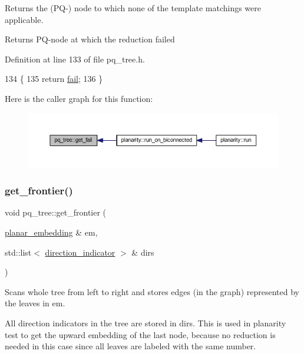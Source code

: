 Returns the (P\+Q-\/) node to which none of the template matchings were applicable. 

\begin{DoxyReturn}{Returns}
P\+Q-\/node at which the reduction failed 
\end{DoxyReturn}


Definition at line 133 of file pq\+\_\+tree.\+h.


\begin{DoxyCode}
134     \{
135     \textcolor{keywordflow}{return} \mbox{\hyperlink{classpq__tree_a4e0a0e6d74a8ac062acf3a05723a35f2}{fail}};
136     \}
\end{DoxyCode}
Here is the caller graph for this function\+:\nopagebreak
\begin{figure}[H]
\begin{center}
\leavevmode
\includegraphics[width=350pt]{classpq__tree_ad5788903c1411626e69e49aaa1b6541b_icgraph}
\end{center}
\end{figure}
\mbox{\label{classpq__tree_a7b4e6037469858019336255cdbd38fa1}} 
\subsubsection{\texorpdfstring{get\+\_\+frontier()}{get\_frontier()}}
{\footnotesize\ttfamily void pq\+\_\+tree\+::get\+\_\+frontier (\begin{DoxyParamCaption}\item[{\mbox{\hyperlink{classplanar__embedding}{planar\+\_\+embedding}} \&}]{em,  }\item[{std\+::list$<$ \mbox{\hyperlink{classdirection__indicator}{direction\+\_\+indicator}} $>$ \&}]{dirs }\end{DoxyParamCaption})}



Scans whole tree from left to right and stores edges (in the graph) represented by the leaves in {\ttfamily em}. 

All direction indicators in the tree are stored in {\ttfamily dirs}. This is used in planarity test to get the upward embedding of the last node, because no reduction is needed in this case since all leaves are labeled with the same number.


